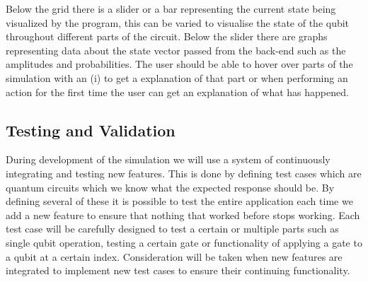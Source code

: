 Below the grid there is a slider or a bar representing the current state being visualized by the program, this can be varied to visualise the state of the qubit throughout different parts of the circuit. Below the slider there are graphs representing data about the state vector passed from the back-end such as the amplitudes and probabilities. The user should be able to hover over parts of the simulation with an (i) to get a explanation of that part or when performing an action for the first time the user can get an explanation of what has happened.

\subsection{Testing and Validation}
During development of the simulation we will use a system of continuously integrating and testing new features. This is done by defining test cases which are quantum circuits which we know what the expected response should be. By defining several of these it is possible to test the entire application each time we add a new feature to ensure that nothing that worked before stops working. Each test case will be carefully designed to test a certain or multiple parts such as single qubit operation, testing a certain gate or functionality of applying a gate to a qubit at a certain index. Consideration will be taken when new features are integrated to implement new test cases to ensure their continuing functionality.




